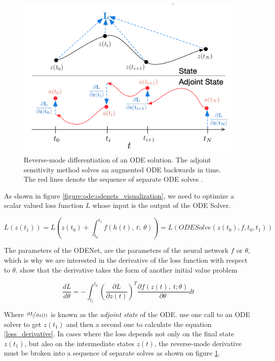 \begin{figure}[ht]
      \centering
      \includegraphics[width=\columnwidth]{figures/adjoint_method.png}
      \caption{Reverse-mode differentiation of an ODE solution. The adjoint sensitivity method solves an augmented ODE backwards in time. The red lines denote the sequence of separate ODE solves \cite{chen2018neural}.}
      \label{ode:adjoint}
\end{figure}

As shown in figure \ref{figure:ode:odenets_visualization}, we need to optimize a scalar valued loss function $ L $ whose input is the output of the ODE Solver.

\begin{equation}
    L(z(t_1)) = L \left( z(t_0) + \int_{t_0}^{t_1} f(h(t), \ t; \ \theta ) \right) = L(ODESolve(z(t_0), f, t_0, t_1))
\end{equation}

The parameters of the ODENet, are the parameters of the neural network $ f $ or $ \theta $, which is why we are interested in the derivative of the loss function with respect to $ \theta $. \citet{pontryagin2018mathematical} show that the derivative takes the form of another initial value problem

\begin{equation}
    \label{loss_derivative}
    \frac{dL}{d\theta} = - \int_{t_1}^{t_0} \left(\frac{\partial L}{\partial z(t)}\right)^T \frac{\partial f(z(t), \ t; \theta)}{\partial \theta}dt
\end{equation}

Where $ \nicefrac{\partial L}{\partial z(t)} $ is known as the \emph{adjoint state} of the ODE. \citet{chen2018neural} use one call to an ODE solver to get $ z(t_1) $ and then a second one to calculate the equation \ref{loss_derivative}. In cases where the loss depends not only on the final state $ z(t_1) $, but also on the intermediate states $ z(t) $, the reverse-mode derivative must be broken into a sequence of separate solves as shown on figure \ref{ode:adjoint}.


